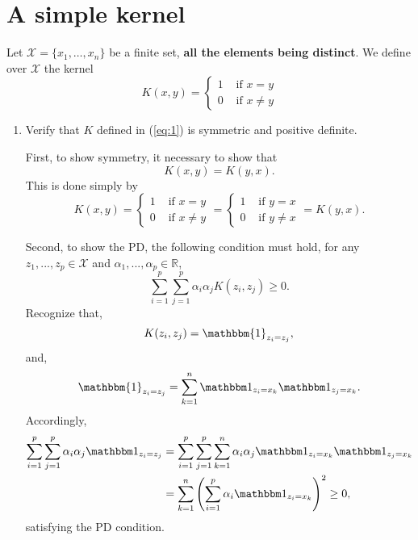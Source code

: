 \documentclass[12pt]{article}
\begin{document}
\newpage


\section{A simple kernel} 
Let $\mathcal{X}=\{x_1,\ldots,x_n\}$ be a finite set, {\bf all the elements being distinct}. 
We define over $\mathcal{X}$ the kernel 
\begin{equation}
\label{eq:1}
K(x,y) = \left\{ \begin{array}{cc}
1 & \mbox{ if } x=y\\
0 & \mbox{ if } x \not = y
\end{array}
\right.
\end{equation}
\begin{enumerate}
\item Verify that $K$ defined in (\ref{eq:1}) is symmetric and positive definite. 

First, to show symmetry, it necessary to show that
\begin{equation}
K(x, y) = K(y, x).
\end{equation}
This is done simply by
\begin{equation}
K(x, y) =  \left\{ \begin{array}{cc}
1 & \mbox{ if } x=y\\
0 & \mbox{ if } x \not = y
\end{array}
\right. 
= 
 \left\{ \begin{array}{cc}
1 & \mbox{ if } y=x\\
0 & \mbox{ if } y \not = x
\end{array}
\right.
= K(y, x).
\end{equation}


Second, to show the PD, the following condition must hold, for any $z_1,...,z_p \in \mathcal X$ and $\alpha_1, ..., \alpha_p \in \mathbb  R$,
\begin{equation}
\sum_{i=1}^{p} \sum_{j=1}^{p} \alpha_i \alpha_j K(z_i, z_j) \ge 0.
\end{equation}
Recognize that,
\begin{equation}
K(z_i, z_j) = \mathbbm{1}_{z_i = z_j},
\end{equation}
and,
\begin{equation}
\mathbbm{1}_{z_i = z_j} = \sum_{k=1}^{n} \mathbbm 1_{z_i = x_k} \mathbbm 1_{z_j = x_k}.
\end{equation}
Accordingly,
\begin{equation}
\begin{aligned}
\sum_{i=1}^{p} \sum_{j=1}^{p} \alpha_{i} \alpha_{j} \mathbbm 1_{z_i = z_j} &= \sum_{i=1}^{p} \sum_{j=1}^{p} \sum_{k=1}^{n} \alpha_{i} \alpha_{j} \mathbbm 1_{z_i = x_k} \mathbbm 1_{z_j = x_k} \\
 &= \sum_{k=1}^{n} \left( \sum_{i=1}^{p} \alpha_i \mathbbm 1_{z_i=x_k} \right)^2 \ge 0,
\end{aligned}
\end{equation}
satisfying the PD condition.


\end{enumerate}
\end{document}

